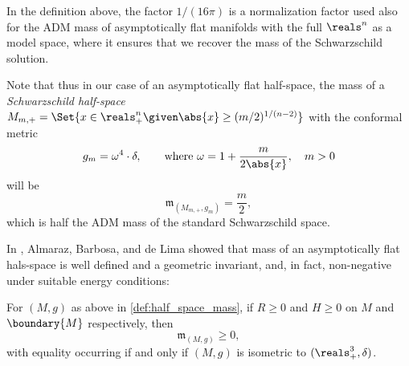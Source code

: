 \documentclass[titlepage,numbers=noenddot,oneside,%
cleardoublepage=empty,paper=a4,fontsize=11pt,%
english,%
]{scrartcl}
\newcommand{\mass}[2]{\mathfrak{m}_{(#1,#2)}} %
\begin{document}
\begin{remark}\label{rem:mass_normalization}
    In the definition above, the factor \( 1/(16\pi) \)  is a normalization factor used also for the ADM mass of asymptotically flat manifolds with the full \( \reals^n \) as a model space, where it ensures that we recover the mass of the Schwarzschild solution. 
    
    Note that thus in our case of an asymptotically flat half-space, the mass of a \emph{Schwarzschild half-space} \( M_{m,+}=\Set{x\in \reals^n_+\given \abs{x}\geq(m/2)^{1/(n-2)}} \) with the conformal metric
    \begin{equation*}
        g_m=\omega^4 \cdot \delta,\qquad \text{where } \omega=1+\frac{m}{2\abs{x}},\quad m>0
    \end{equation*}
    will be
    \begin{equation*}
        \mass{M_{m,+}}{g_m}=\frac{m}{2},
    \end{equation*}
    which is half the ADM mass of the standard Schwarzschild space.
\end{remark}
In \cite{almarazPositiveMassTheorem2016}, Almaraz, Barbosa, and de Lima showed that mass of an asymptotically flat hals-space is well defined and a geometric invariant, and, in fact, non-negative under suitable energy conditions:
\begin{theorem}\label{thm:positive_mass_theorem_for_half_spaces}
    For \( (M,g) \) as above in \cref{def:half_space_mass}, if \( R\geq 0 \) and \( H\geq 0 \) on \( M \) and \( \boundary{M} \) respectively, then
    \begin{equation*}
        \mass{M}{g}\geq 0,
    \end{equation*}  
    with equality occurring if and only if \( (M,g) \) is isometric to \( (\reals^3_+,\delta) \).
\end{theorem}
\end{document}
